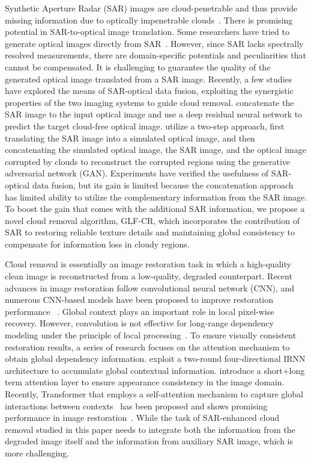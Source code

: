 \documentclass[a4paper,fleqn]{cas-dc}
\begin{document}
Synthetic Aperture Radar (SAR) images are cloud-penetrable and thus provide missing information due to optically impenetrable clouds~\citep{bamler2000principles}. There is promising potential in SAR-to-optical image translation. Some researchers have tried to generate optical images directly from SAR~\citep{bermudez2018sar, fuentes2019sar}. However, since SAR lacks spectrally resolved measurements, there are domain-specific potentials and peculiarities that cannot be compensated. It is challenging to guarantee the quality of the generated optical image translated from a SAR image. Recently, a few studies have explored the means of SAR-optical data fusion, exploiting the synergistic properties of the two imaging systems to guide cloud removal.  
\cite{meraner2020cloud} concatenate the SAR image to the input optical image and use a deep residual neural network to predict the target cloud-free optical image. \cite{gao2020cloud} utilize a two-step approach, first translating the SAR image into a simulated optical image, and then concatenating the simulated optical image, the SAR image, and the optical image corrupted by clouds to reconstruct the corrupted regions using the generative adversarial network (GAN). Experiments have verified the usefulness of SAR-optical data fusion, but its gain is limited because the concatenation approach has limited ability to utilize the complementary information from the SAR image. 
To boost the gain that comes with the additional SAR information, we propose a novel cloud removal algorithm, GLF-CR, which incorporates the contribution of SAR to restoring reliable texture details and maintaining global consistency to compensate for information loss in cloudy regions.



Cloud removal is essentially an image restoration task in which a high-quality clean image is reconstructed from a low-quality, degraded counterpart. 
Recent advances in image restoration follow  convolutional neural network (CNN), and numerous CNN-based models have been proposed to improve restoration performance ~\citep{zhang2018image, zhang2020residual, wang2021learning}.
Global context plays an important role in local pixel-wise recovery.
However, convolution is not effective for long-range dependency modeling under the principle of local processing~\citep{liang2021swinir}.
To ensure visually consistent restoration results, a series of research focuses on the attention mechanism to obtain global dependency information.
\cite{wang2019spatial} exploit a two-round four-directional IRNN architecture to accumulate global contextual information. 
\cite{zheng2019pluralistic} introduce a short+long term attention layer to ensure appearance consistency in the image domain.
Recently, Transformer that employs a self-attention mechanism to capture global interactions between contexts~\citep{liu2021swin} has been proposed and shows promising performance in image restoration~\citep{liang2021swinir}. 
While the task of SAR-enhanced cloud removal studied in this paper needs to integrate both the information from the degraded image itself and the information from auxiliary SAR image, which is more challenging. 
 
\end{document}
